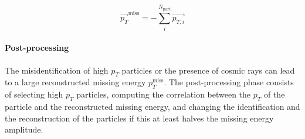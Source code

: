 \begin{equation}
    \vec{p_T}^{\text{miss}}=-\sum_i^{N_{\text{part}}} \vec{p_{T,i}}
\end{equation}

\paragraph*{Post-processing}
The misidentification of high $p_T$ particles or the presence of cosmic rays can lead to a large reconstructed missing energy $p_T^{\text{miss}}$.
The post-processing phase consists of selecting high $p_T$ particles, computing the correlation between the $p_T$ of the particle and the reconstructed missing energy, and changing the identification and the reconstruction of the particles if this at least halves the missing energy amplitude.\\

